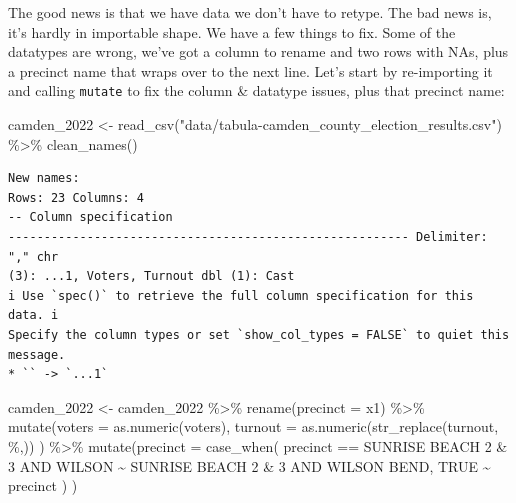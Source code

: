 \documentclass[
  letterpaper,
  DIV=11,
  numbers=noendperiod]{scrreprt}
\newenvironment{Shaded}{\begin{snugshade}}{\end{snugshade}}
\newcommand{\AttributeTok}[1]{\textcolor[rgb]{0.40,0.45,0.13}{#1}}
\newcommand{\ConstantTok}[1]{\textcolor[rgb]{0.56,0.35,0.01}{#1}}
\newcommand{\FunctionTok}[1]{\textcolor[rgb]{0.28,0.35,0.67}{#1}}
\newcommand{\NormalTok}[1]{\textcolor[rgb]{0.00,0.23,0.31}{#1}}
\newcommand{\OtherTok}[1]{\textcolor[rgb]{0.00,0.23,0.31}{#1}}
\newcommand{\SpecialCharTok}[1]{\textcolor[rgb]{0.37,0.37,0.37}{#1}}
\newcommand{\StringTok}[1]{\textcolor[rgb]{0.13,0.47,0.30}{#1}}
\begin{document}
The good news is that we have data we don't have to retype. The bad news
is, it's hardly in importable shape. We have a few things to fix. Some
of the datatypes are wrong, we've got a column to rename and two rows
with NAs, plus a precinct name that wraps over to the next line. Let's
start by re-importing it and calling \texttt{mutate} to fix the column
\& datatype issues, plus that precinct name:

\begin{Shaded}
\begin{Highlighting}[]
\NormalTok{camden\_2022 }\OtherTok{\textless{}{-}} \FunctionTok{read\_csv}\NormalTok{(}\StringTok{"data/tabula{-}camden\_county\_election\_results.csv"}\NormalTok{) }\SpecialCharTok{\%\textgreater{}\%} \FunctionTok{clean\_names}\NormalTok{()}
\end{Highlighting}
\end{Shaded}

\begin{verbatim}
New names:
Rows: 23 Columns: 4
-- Column specification
-------------------------------------------------------- Delimiter: "," chr
(3): ...1, Voters, Turnout dbl (1): Cast
i Use `spec()` to retrieve the full column specification for this data. i
Specify the column types or set `show_col_types = FALSE` to quiet this message.
* `` -> `...1`
\end{verbatim}

\begin{Shaded}
\begin{Highlighting}[]
\NormalTok{camden\_2022 }\OtherTok{\textless{}{-}}\NormalTok{ camden\_2022 }\SpecialCharTok{\%\textgreater{}\%}
  \FunctionTok{rename}\NormalTok{(}\AttributeTok{precinct =}\NormalTok{ x1) }\SpecialCharTok{\%\textgreater{}\%}
  \FunctionTok{mutate}\NormalTok{(}\AttributeTok{voters =} \FunctionTok{as.numeric}\NormalTok{(voters),}
         \AttributeTok{turnout =} \FunctionTok{as.numeric}\NormalTok{(}\FunctionTok{str\_replace}\NormalTok{(turnout, }\StringTok{\textquotesingle{}\%\textquotesingle{}}\NormalTok{,}\StringTok{\textquotesingle{}\textquotesingle{}}\NormalTok{))}
\NormalTok{         ) }\SpecialCharTok{\%\textgreater{}\%}
  \FunctionTok{mutate}\NormalTok{(}\AttributeTok{precinct =} \FunctionTok{case\_when}\NormalTok{(}
\NormalTok{    precinct }\SpecialCharTok{==} \StringTok{\textquotesingle{}SUNRISE BEACH 2 \& 3 AND WILSON\textquotesingle{}} \SpecialCharTok{\textasciitilde{}} \StringTok{\textquotesingle{}SUNRISE BEACH 2 \& 3 AND WILSON BEND\textquotesingle{}}\NormalTok{,}
    \ConstantTok{TRUE} \SpecialCharTok{\textasciitilde{}}\NormalTok{ precinct}
\NormalTok{  )}
\NormalTok{)}
\end{Highlighting}
\end{Shaded}
\end{document}
